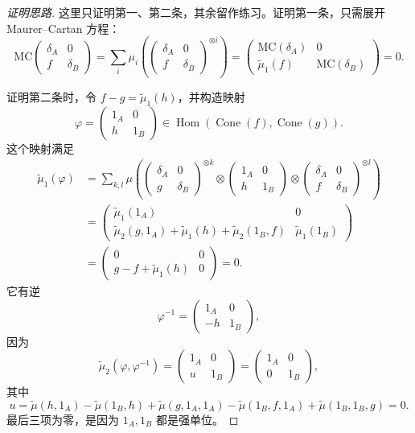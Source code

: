 \begin{proof}[证明思路]
这里只证明第一、第二条，其余留作练习。证明第一条，只需展开 Maurer--Cartan 方程：
\[
  \mathrm{MC}
  \begin{pmatrix}\delta_A&0\\f&\delta_B\end{pmatrix}
  =
  \sum_i\mu_i\left(
    \begin{pmatrix}\delta_A&0\\f&\delta_B\end{pmatrix}^{\otimes i}
  \right)
  =
  \begin{pmatrix}
    \mathrm{MC}(\delta_A)&0\\
    \widetilde\mu_1(f)&\mathrm{MC}(\delta_B)
  \end{pmatrix}=0.
\]

证明第二条时，令 $f-g=\widetilde\mu_1(h)$，并构造映射
\[
  \varphi=
  \begin{pmatrix}1_A&0\\h&1_B\end{pmatrix}
  \in\operatorname{Hom}(\operatorname{Cone}(f),\operatorname{Cone}(g)).
\]
这个映射满足
\begin{align*}
  \widetilde\mu_1(\varphi)
  &=
  \sum_{k,l}
  \mu\left(
  \begin{pmatrix}\delta_A&0\\g&\delta_B\end{pmatrix}^{\otimes k}
  \otimes
  \begin{pmatrix}1_A&0\\h&1_B\end{pmatrix}
  \otimes
  \begin{pmatrix}\delta_A&0\\f&\delta_B\end{pmatrix}^{\otimes l}
  \right)\\
  &=
  \begin{pmatrix}
    \widetilde\mu_1(1_A)&0\\
    \widetilde\mu_2(g,1_A)+\widetilde\mu_1(h)
       +\widetilde\mu_2(1_B,f)&\widetilde\mu_1(1_B)
  \end{pmatrix}\\
  &=
  \begin{pmatrix}0&0\\g-f+\widetilde\mu_1(h)&0\end{pmatrix}=0.
\end{align*}
它有逆
\[
  \varphi^{-1}=
  \begin{pmatrix}1_A&0\\-h&1_B\end{pmatrix},
\]
因为
\[
  \widetilde\mu_2(\varphi,\varphi^{-1})
  =
  \begin{pmatrix}1_A&0\\u&1_B\end{pmatrix}
  =
  \begin{pmatrix}1_A&0\\0&1_B\end{pmatrix},
\]
其中
\[
  u=\widetilde\mu(h,1_A)-\widetilde\mu(1_B,h)
    +\widetilde\mu(g,1_A,1_A)-\widetilde\mu(1_B,f,1_A)
    +\widetilde\mu(1_B,1_B,g)=0.
\]
最后三项为零，是因为 $1_A,1_B$ 都是强单位。
\end{proof}

